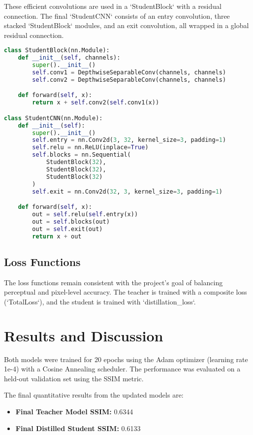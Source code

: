 \documentclass[12pt,a4paper]{article}
\begin{document}
These efficient convolutions are used in a `StudentBlock` with a residual connection. The final `StudentCNN` consists of an entry convolution, three stacked `StudentBlock` modules, and an exit convolution, all wrapped in a global residual connection.

\begin{lstlisting}[language=Python, caption={Updated StudentCNN Architecture}]
class StudentBlock(nn.Module):
    def __init__(self, channels):
        super().__init__()
        self.conv1 = DepthwiseSeparableConv(channels, channels)
        self.conv2 = DepthwiseSeparableConv(channels, channels)

    def forward(self, x):
        return x + self.conv2(self.conv1(x))

class StudentCNN(nn.Module):
    def __init__(self):
        super().__init__()
        self.entry = nn.Conv2d(3, 32, kernel_size=3, padding=1)
        self.relu = nn.ReLU(inplace=True)
        self.blocks = nn.Sequential(
            StudentBlock(32),
            StudentBlock(32),
            StudentBlock(32)
        )
        self.exit = nn.Conv2d(32, 3, kernel_size=3, padding=1)

    def forward(self, x):
        out = self.relu(self.entry(x))
        out = self.blocks(out)
        out = self.exit(out)
        return x + out
\end{lstlisting}

\subsection{Loss Functions}
The loss functions remain consistent with the project's goal of balancing perceptual and pixel-level accuracy. The teacher is trained with a composite loss (`TotalLoss`), and the student is trained with `distillation_loss`.

\newpage
\section{Results and Discussion}
Both models were trained for 20 epochs using the Adam optimizer (learning rate 1e-4) with a Cosine Annealing scheduler. The performance was evaluated on a held-out validation set using the SSIM metric.

The final quantitative results from the updated models are:
\begin{itemize}
    \item \textbf{Final Teacher Model SSIM:} 0.6344
    \item \textbf{Final Distilled Student SSIM:} 0.6133
\end{itemize}
\end{document}
